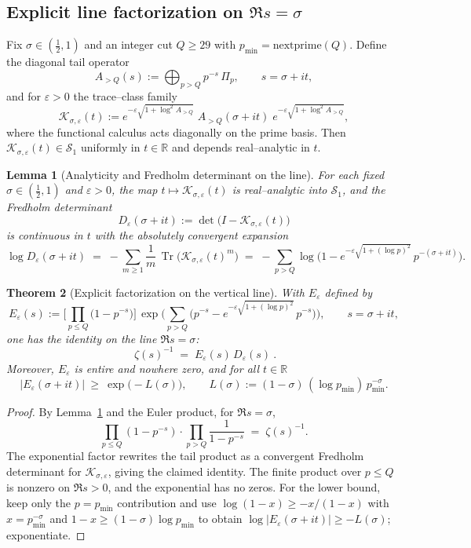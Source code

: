\documentclass[11pt]{article}
\newtheorem{theorem}{Theorem}
\newtheorem{lemma}[theorem]{Lemma}
\theoremstyle{definition}
\theoremstyle{remark}
\newcommand{\R}{\mathbb{R}}
\DeclareMathOperator{\Tr}{Tr}
\begin{document}
\subsection*{Explicit line factorization on $\Re s=\sigma$}
Fix $\sigma\in(\tfrac12,1)$ and an integer cut $Q\ge 29$ with $p_{\min}=\mathrm{nextprime}(Q)$. Define the diagonal tail operator
\[
  A_{>Q}(s):=\bigoplus_{p>Q} p^{-s}\,\Pi_p,\qquad s=\sigma+it,
\]
and for $\varepsilon>0$ the trace--class family
\[
  \mathcal K_{\sigma,\varepsilon}(t)
    := e^{-\varepsilon\sqrt{1+\log^2 A_{>Q}}}\; A_{>Q}(\sigma+it)\; e^{-\varepsilon\sqrt{1+\log^2 A_{>Q}}},
\]
where the functional calculus acts diagonally on the prime basis. Then $\mathcal K_{\sigma,\varepsilon}(t)\in\mathcal S_1$ uniformly in $t\in\R$ and depends real--analytic in $t$.

\begin{lemma}[Analyticity and Fredholm determinant on the line]\label{lem:line-fredholm}
For each fixed $\sigma\in(\tfrac12,1)$ and $\varepsilon>0$, the map $t\mapsto \mathcal K_{\sigma,\varepsilon}(t)$ is real--analytic into $\mathcal S_1$, and the Fredholm determinant
\[
  D_\varepsilon(\sigma+it):=\det\big(I-\mathcal K_{\sigma,\varepsilon}(t)\big)
\]
is continuous in $t$ with the absolutely convergent expansion
\[
  \log D_\varepsilon(\sigma+it)\;=\; -\sum_{m\ge 1}\frac{1}{m}\,\Tr\big(\mathcal K_{\sigma,\varepsilon}(t)^m\big)
  \;=\; -\sum_{p>Q}\log\Big(1-e^{-\varepsilon\sqrt{1+(\log p)^2}}\,p^{-(\sigma+it)}\Big).
\]
\end{lemma}

\begin{theorem}[Explicit factorization on the vertical line]\label{thm:line-factorization}
With $E_\varepsilon$ defined by
\[
  E_\varepsilon(s)
  := \Bigg[\prod_{p\le Q}\big(1-p^{-s}\big)\Bigg]\,
     \exp\!\Bigg(\sum_{p>Q}\Big(p^{-s}-e^{-\varepsilon\sqrt{1+(\log p)^2}}\,p^{-s}\Big)\Bigg),\qquad s=\sigma+it,
\]
one has the identity on the line $\Re s=\sigma$:
\[
  \boxed{\ \zeta(s)^{-1}\;=\;E_\varepsilon(s)\,D_\varepsilon(s)\ }.
\]
Moreover, $E_\varepsilon$ is entire and nowhere zero, and for all $t\in\R$
\[
  \big|E_\varepsilon(\sigma+it)\big|\ \ge\ \exp\!\big( -L(\sigma)\big),\qquad
  L(\sigma):=(1-\sigma)\,(\log p_{\min})\,p_{\min}^{-\sigma}.
\]
\end{theorem}

\begin{proof}
By Lemma~\ref{lem:line-fredholm} and the Euler product, for $\Re s=\sigma$,
\[
  \prod_{p\le Q}(1-p^{-s})\cdot \prod_{p>Q}\frac{1}{1-p^{-s}}
  \;=\;\zeta(s)^{-1}.
\]
The exponential factor rewrites the tail product as a convergent Fredholm determinant for $\mathcal K_{\sigma,\varepsilon}$, giving the claimed identity. The finite product over $p\le Q$ is nonzero on $\Re s>0$, and the exponential has no zeros. For the lower bound, keep only the $p=p_{\min}$ contribution and use $\log(1-x)\ge -x/(1-x)$ with $x=p_{\min}^{-\sigma}$ and $1-x\ge (1-\sigma)\log p_{\min}$ to obtain $\log|E_\varepsilon(\sigma+it)|\ge -L(\sigma)$; exponentiate.
\end{proof}
\end{document}
